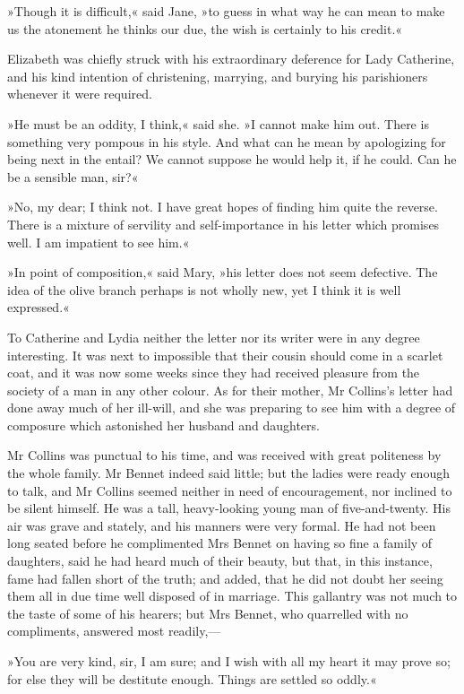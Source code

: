»Though it is difficult,« said Jane, »to guess in what way he can mean to make us the atonement he thinks our due, the wish is certainly to his credit.«

Elizabeth was chiefly struck with his extraordinary deference for Lady Catherine, and his kind intention of christening, marrying, and burying his parishioners whenever it were required.

»He must be an oddity, I think,« said she. »I cannot make him out. There is something very pompous in his style. And what can he mean by apologizing for being next in the entail? We cannot suppose he would help it, if he could. Can he be a sensible man, sir?«

»No, my dear; I think not. I have great hopes of finding him quite the reverse. There is a mixture of servility and self-importance in his letter which promises well. I am impatient to see him.«

»In point of composition,« said Mary, »his letter does not seem defective. The idea of the olive branch perhaps is not wholly new, yet I think it is well expressed.«

To Catherine and Lydia neither the letter nor its writer were in any degree interesting. It was next to impossible that their cousin should come in a scarlet coat, and it was now some weeks since they had received pleasure from the society of a man in any other colour. As for their mother, Mr Collins's letter had done away much of her ill-will, and she was preparing to see him with a degree of composure which astonished her husband and daughters.

Mr Collins was punctual to his time, and was received with great politeness by the whole family. Mr Bennet indeed said little; but the ladies were ready enough to talk, and Mr Collins seemed neither in need of encouragement, nor inclined to be silent himself. He was a tall, heavy-looking young man of five-and-twenty. His air was grave and stately, and his manners were very formal. He had not been long seated before he complimented Mrs Bennet on having so fine a family of daughters, said he had heard much of their beauty, but that, in this instance, fame had fallen short of the truth; and added, that he did not doubt her seeing them all in due time well disposed of in marriage. This gallantry was not much to the taste of some of his hearers; but Mrs Bennet, who quarrelled with no compliments, answered most readily,—

»You are very kind, sir, I am sure; and I wish with all my heart it may prove so; for else they will be destitute enough. Things are settled so oddly.«

